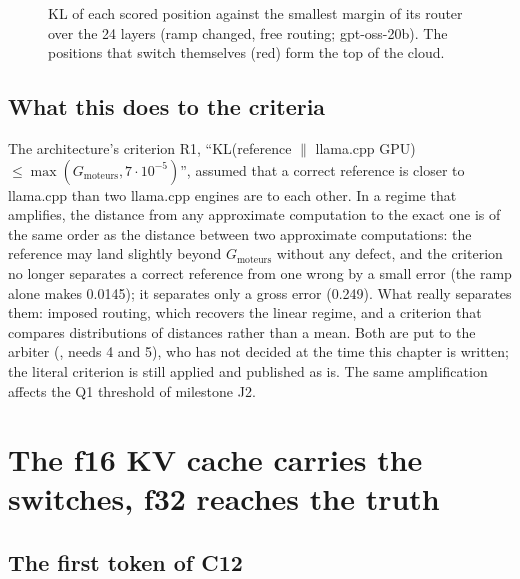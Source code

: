 \begin{figure}[ht]
\centering
\GrapheRefBascules
\caption[KL per position against the router margin]{KL of each scored position against the smallest margin of its router over the 24 layers (ramp changed, free routing; gpt-oss-20b). The positions that switch themselves (red) form the top of the cloud.}
\label{fig:t2r-bascules}
\end{figure}

\subsection{What this does to the criteria}\label{sec:t2r-criteres}

The architecture's criterion R1, \enquote{KL(reference $\|$ llama.cpp GPU) $\le \max(G_{\text{moteurs}}, 7\cdot10^{-5})$}, assumed that a correct reference is closer to llama.cpp than two llama.cpp engines are to each other. In a regime that amplifies, the distance from any approximate computation to the exact one is of the same order as the distance between two approximate computations: the reference may land slightly beyond $G_{\text{moteurs}}$ without any defect, and the criterion no longer separates a correct reference from one wrong by a small error (the ramp alone makes 0.0145); it separates only a gross error (0.249). What really separates them: imposed routing, which recovers the linear regime, and a criterion that compares distributions of distances rather than a mean. Both are put to the arbiter (, needs 4 and 5), who has not decided at the time this chapter is written; the literal criterion is still applied and published as is. The same amplification affects the Q1 threshold of milestone J2.

\section{The f16 KV cache carries the switches, f32 reaches the truth}\label{sec:t2r-kv}

\subsection{The first token of C12}\label{sec:t2r-c12}

